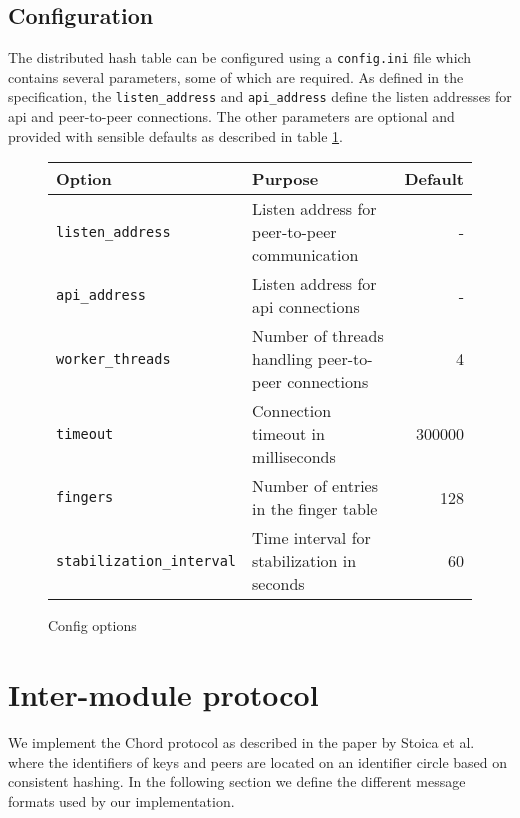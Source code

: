 \documentclass[a4paper, 11pt]{article}
\begin{document}
    \subsection{Configuration}
    
    The distributed hash table can be configured using a \texttt{config.ini} file which contains several parameters, some of which are required. As defined in the specification, the \texttt{listen\_address} and \texttt{api\_address} define the listen addresses for api and peer-to-peer connections. The other parameters are optional and provided with sensible defaults as described in table \ref{table:config}.
    
    
    \begin{figure}[H]
        \begin{longtable}{l l r}
            \toprule
            \textbf{Option} & \textbf{Purpose} & \textbf{Default} \\
            \midrule
            \texttt{listen\_address}         & Listen address for peer-to-peer communication       & - \\
            \texttt{api\_address}            & Listen address for api connections                  & - \\
            \texttt{worker\_threads}         & Number of threads handling peer-to-peer connections & 4 \\
            \texttt{timeout}                 & Connection timeout in milliseconds                  & 300000 \\
            \texttt{fingers}                 & Number of entries in the finger table               & 128 \\
            \texttt{stabilization\_interval} & Time interval for stabilization in seconds          & 60 \\
            \bottomrule
        \end{longtable}
        \caption{Config options}
        \label{table:config}
    \end{figure}
    
    \section{Inter-module protocol}
    
    We implement the Chord protocol as described in the paper by Stoica et al. \cite{Chord} where the identifiers of keys and peers are located on an identifier circle based on consistent hashing. In the following section we define the different message formats used by our implementation.
    
\end{document}
